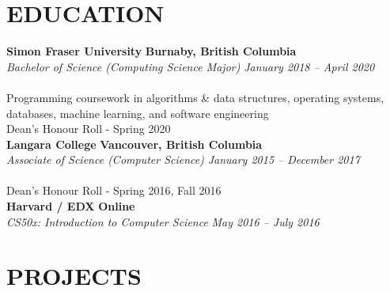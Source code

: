 \documentclass[margin,line]{resume}
\begin{document}
\begin{resume}
\sectionline

    \section{\mysidestyle \textbf{\large{E}\small{DUCATION}}}

    \textbf{\listing Simon Fraser University} \hfill \textbf{Burnaby, British Columbia} \vspace{1mm}\\
    \textsl{Bachelor of Science (Computing Science Major)} \hfill \textsl{January 2018 -- April 2020}\vspace{-3mm}\\\vspace{-1mm}\\
    Programming coursework in algorithms \& data structures, operating systems, databases, machine learning, and software engineering\\
    Dean’s Honour Roll - Spring 2020\\
    
    \textbf{\listing Langara College} \hfill \textbf{Vancouver, British Columbia} \vspace{1mm}\\
    \textsl{Associate of Science (Computer Science)} \hfill \textsl{January 2015 -- December 2017}\vspace{-3mm}\\\vspace{-1mm}\\
    Dean’s Honour Roll - Spring 2016, Fall 2016\\

    \textbf{\listing Harvard / EDX} \hfill \textbf{Online} \vspace{1mm}\\
    \textsl{CS50x: Introduction to Computer Science} \hfill \textsl{May 2016 -- July 2016}\vspace{-3mm}\\\vspace{-1mm}%

    \vspace{-1mm}

\sectionline

    \section{\mysidestyle \textbf{\large{P}\small{ROJECTS}}}


\end{resume}
\end{document}
